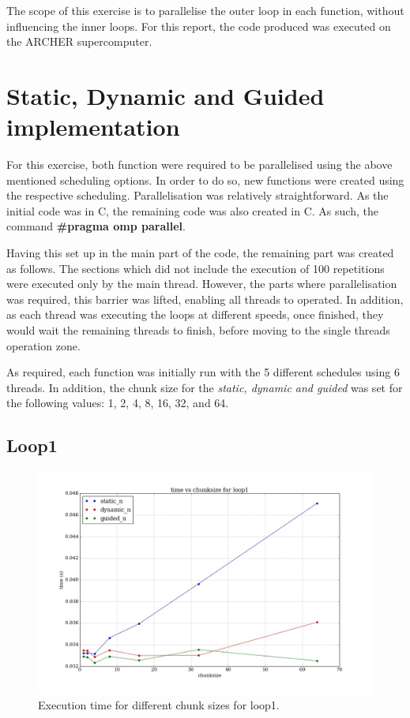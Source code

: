 \documentclass[12pt]{article}
\begin{document}
	The scope of this exercise is to parallelise the outer loop in each function, without influencing the inner loops. For this report, the code produced was executed on the ARCHER supercomputer.

	\pagebreak
	
	\section{Static, Dynamic and Guided implementation}
	
	For this exercise, both function were required to be parallelised using the above mentioned scheduling options. In order to do so, new functions were created using the respective scheduling. Parallelisation was relatively straightforward. As the initial code was in C, the remaining code was also created in C. As such, the command \textbf{\#pragma omp parallel}. 
	
	Having this set up in the main part of the code, the remaining part was created as follows. The sections which did not include the execution of 100 repetitions were executed only by the main thread. However, the parts where parallelisation was required, this barrier was lifted, enabling all threads to operated. In addition, as each thread was executing the loops at different speeds, once finished, they would wait the remaining threads to finish, before moving to the single threads operation zone.
	
	As required, each function was initially run with the 5 different schedules using 6 threads. In addition, the chunk size for the \textit{static, dynamic and guided} was set for the following values: 1, 2, 4, 8, 16, 32, and 64. 
	
	\subsection{Loop1}
	\begin{figure}[H]	
		\centering
		\includegraphics[scale=0.4]{loop1.jpeg}
		\caption{Execution time for different chunk sizes for loop1.}\label{loop1}
	\end{figure}
	
\end{document}
